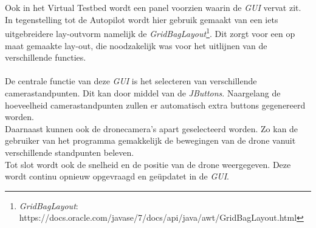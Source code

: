\\
\\
Ook in het Virtual Testbed wordt een panel voorzien waarin de \textit{GUI} vervat zit. In tegenstelling tot de Autopilot wordt hier gebruik gemaakt van een iets uitgebreidere lay-outvorm namelijk de \textit{GridBagLayout}\footnote{\textit{GridBagLayout}: https://docs.oracle.com/javase/7/docs/api/java/awt/GridBagLayout.html}. Dit zorgt voor een op maat gemaakte lay-out, die noodzakelijk was voor het uitlijnen van de verschillende functies. 
\\
\\
De centrale functie van deze \textit{GUI} is het selecteren van verschillende camerastandpunten. Dit kan door middel van de \textit{JButtons}. Naargelang de hoeveelheid camerastandpunten zullen er automatisch extra buttons gegenereerd worden.
\\
Daarnaast kunnen ook de dronecamera's apart geselecteerd worden. Zo kan de gebruiker van het programma gemakkelijk de bewegingen van de drone vanuit verschillende standpunten beleven.  
\\
Tot slot wordt ook de snelheid en de positie van de drone weergegeven. Deze wordt continu opnieuw opgevraagd en ge\"{u}pdatet in de \textit{GUI}. 